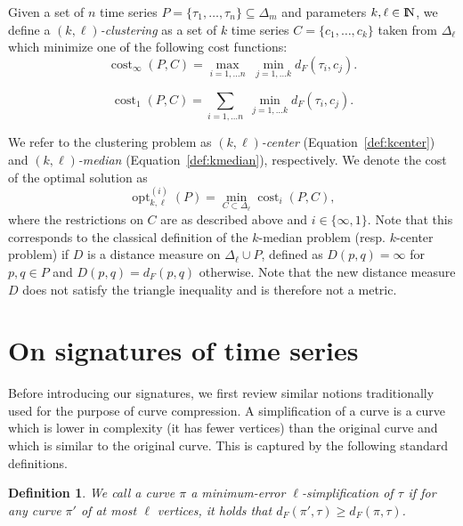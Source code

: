 \documentclass[11pt, letter]{article}
\DeclareMathOperator{\cost}{cost}
\DeclareMathOperator{\opt}{opt}
\newtheorem{definition}[theorem]{Definition}
\newcommand{\seclab}[1]{\label{sec:#1}}
\newcommand{\deflab}[1]{\label{def:#1}}
\providecommand{\pth}[2][\!]{#1\left({#2}\right)}
\newcommand{\Na}{{\rm I\!\hspace{-0.025em} N}}
\newcommand{\nrClusters}{\ensuremath{k}}
\newcommand{\lenClusters}{\ensuremath{\ell}}
\newcommand{\trajectory}[2]{\ensuremath{{#1}_{#2}}}
\newcommand{\inputSym}{\ensuremath{\tau}}
\newcommand{\centerSym}{\ensuremath{c}}
\newcommand{\inputTraj}[1]{\trajectory{\inputSym}{#1}}
\newcommand{\centerTraj}[1]{\trajectory{\centerSym}{#1}}
\newcommand{\distFr}[2]{\ensuremath{d_F\pth{#1,#2}}}
\begin{document}
Given a set of $n$ time series $P=\lbrace\inputTraj{1},\ldots , \inputTraj{n}\rbrace \subseteq \Delta_m$ and parameters $\nrClusters,\lenClusters \in \Na$, we define a \emph{$(\nrClusters,\lenClusters)$-clustering}  as a set of $\nrClusters$ time series $C=\lbrace\centerTraj{1},\ldots , \centerTraj{\nrClusters}\rbrace$ taken from $\Delta_{\lenClusters}$  which minimize one of the following cost functions:
\begin{equation} \label{def:kcenter} 
\cost_{\infty}(P,C)=\max_{i=1,\ldots n}\; \min_{j=1,\ldots \nrClusters}
\distFr{\inputTraj{i}}{\centerTraj{j}}. \end{equation} 

\begin{equation} \label{def:kmedian} 
\cost_1(P,C)=\sum_{i=1,\ldots n}\; \min_{j=1,\ldots \nrClusters}
\distFr{\inputTraj{i}}{\centerTraj{j}}. \end{equation} 

We refer to the clustering problem as 
\emph{$(\nrClusters,\lenClusters)$-center} (Equation~\ref{def:kcenter}) 
and \emph{$(\nrClusters,\lenClusters)$-median} (Equation~\ref{def:kmedian}),
respectively. 
We denote the cost of the optimal solution as 
\[ \opt^{(i)}_{\nrClusters,\lenClusters}(P) = \min_{C \subset \Delta_{\lenClusters}} \cost_{i}(P,C),\]
where the restrictions on $C$ are as described above and $i \in \{\infty,1\}$.
Note that this corresponds to the classical definition of the $k$-median problem (resp. $k$-center problem) 
if $D$ is a distance measure on $\Delta_{\ell} \cup P$, 
defined as $D(p,q)=\infty$ for $p,q \in P$
and $D(p,q)=\distFr{p}{q}$ otherwise. Note that the new distance measure $D$
does not satisfy the triangle inequality and is therefore not a metric.

\section{On signatures of time series}
\seclab{on:signatures}

Before introducing our signatures, we first review similar notions traditionally
used for the purpose of curve compression. 
A simplification of a curve is a curve which is lower in complexity (it has
fewer vertices) than the original curve and which is similar to the original
curve. This is captured by the following standard definitions.  

\begin{definition}\deflab{min:error:simp}
We call a curve $\pi$ a minimum-error $\ell$-simplification of $\inputTraj{}$ if
for any curve $\pi'$ of at most $\ell$ vertices, it holds that
$\distFr{\pi'}{\tau} \geq \distFr{\pi}{\tau}$.
\end{definition}
\end{document}

